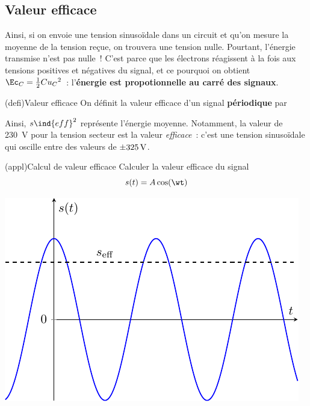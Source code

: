 \documentclass[../../main/main.tex]{subfiles}
\begin{document}
\subsection{Valeur efficace}
Ainsi, si on envoie une tension sinusoïdale dans un circuit et qu'on mesure la
moyenne de la tension reçue, on trouvera une tension nulle. Pourtant, l'énergie
transmise n'est pas nulle~! C'est parce que les électrons réagissent à la fois
aux tensions positives et négatives du signal, et ce pourquoi on obtient $\Ec_C
	= \frac{1}{2}Cu_C{}^{2}$~: l'\textbf{énergie est propotionnelle au carré des
	signaux}.
\begin{tcb*}(defi){Valeur efficace}
	On définit la valeur efficace d'un signal \textbf{périodique} par
	\psw{
		\[
			s \ind{eff} = \sqrt{\moy{s^{2}(t)}}
		\]
	}
	\vspace{-15pt}
\end{tcb*}
Ainsi, $s \ind{eff}^{2}$ représente l'énergie moyenne. Notamment, la valeur de
\SI{230}{V} pour la tension secteur est la valeur \textit{efficace}~: c'est une
tension sinusoïdale qui oscille entre des valeurs de $\SI{\pm 325}{V}$.

\begin{tcb*}[sidebyside, lefthand ratio=.4](appl){Calcul de valeur efficace}
	Calculer la valeur efficace du signal
	\[
		s(t) = A \cos(\wt)
	\]
	\begin{center}
		\includegraphics[width=\linewidth]{veff_cos}
	\end{center}
	\tcblower
\end{tcb*}
\end{document}
